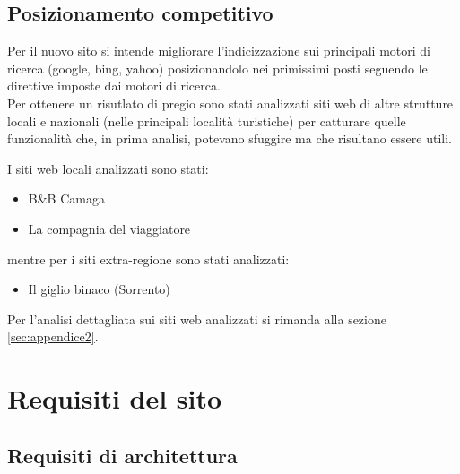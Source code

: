 \documentclass[a4paper,12pt,hidelinks]{report}
\begin{document}
\section{Posizionamento competitivo}
  \par Per il nuovo sito si intende migliorare l'indicizzazione sui principali motori di ricerca (google, bing, yahoo) posizionandolo nei primissimi posti 
  seguendo le direttive imposte dai motori di ricerca.
  \\Per ottenere un risutlato di pregio sono stati analizzati siti web di altre strutture locali e nazionali (nelle principali località turistiche)
  per catturare quelle funzionalità che, in prima analisi, potevano sfuggire ma che risultano essere utili.
  \par I siti web locali analizzati sono stati:
  \begin{itemize}
    \item B\&B Camaga
    \item La compagnia del viaggiatore
  \end{itemize}
  mentre per i siti extra-regione sono stati analizzati:
  \begin{itemize}
    \item Il giglio binaco (Sorrento)
  \end{itemize}
  Per l'analisi dettagliata sui siti web analizzati si rimanda alla sezione \ref{sec:appendice2}.

\chapter{Requisiti del sito}

\section{Requisiti di architettura}
\end{document}
